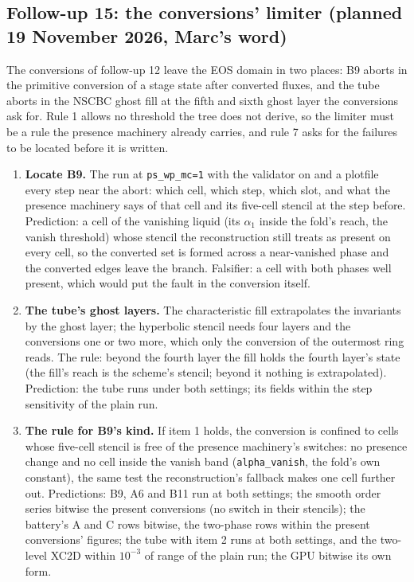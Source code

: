 \documentclass[11pt,a4paper]{article}
\newcommand{\code}[1]{\texttt{\small #1}}
\begin{document}
\subsection*{Follow-up 15: the conversions' limiter (planned 19 November 2026, Marc's word)}

The conversions of follow-up 12 leave the EOS domain in two places: B9
aborts in the primitive conversion of a stage state after converted
fluxes, and the tube aborts in the NSCBC ghost fill at the fifth and
sixth ghost layer the conversions ask for.  Rule 1 allows no threshold
the tree does not derive, so the limiter must be a rule the presence
machinery already carries, and rule 7 asks for the failures to be
located before it is written.
\begin{enumerate}[nosep]
\item \textbf{Locate B9.}  The run at \code{ps\_wp\_mc=1} with the
      validator on and a plotfile every step near the abort: which cell,
      which step, which slot, and what the presence machinery says of
      that cell and its five-cell stencil at the step before.
      Prediction: a cell of the vanishing liquid (its $\alpha_1$ inside
      the fold's reach, the vanish threshold) whose stencil the
      reconstruction still treats as present on every cell, so the
      converted set is formed across a near-vanished phase and the
      converted edges leave the branch.  Falsifier: a cell with both
      phases well present, which would put the fault in the conversion
      itself.
\item \textbf{The tube's ghost layers.}  The characteristic fill
      extrapolates the invariants by the ghost layer; the hyperbolic
      stencil needs four layers and the conversions one or two more,
      which only the conversion of the outermost ring reads.  The rule:
      beyond the fourth layer the fill holds the fourth layer's state
      (the fill's reach is the scheme's stencil; beyond it nothing is
      extrapolated).  Prediction: the tube runs under both settings; its
      fields within the step sensitivity of the plain run.
\item \textbf{The rule for B9's kind.}  If item 1 holds, the conversion
      is confined to cells whose five-cell stencil is free of the
      presence machinery's switches: no presence change and no cell
      inside the vanish band (\code{alpha\_vanish}, the fold's own
      constant), the same test the reconstruction's fallback makes one
      cell further out.  Predictions: B9, A6 and B11 run at both
      settings; the smooth order series bitwise the present conversions
      (no switch in their stencils); the battery's A and C rows bitwise,
      the two-phase rows within the present conversions' figures; the
      tube with item 2 runs at both settings, and the two-level XC2D
      within $10^{-3}$ of range of the plain run; the GPU bitwise its
      own form.
\end{enumerate}
\end{document}
